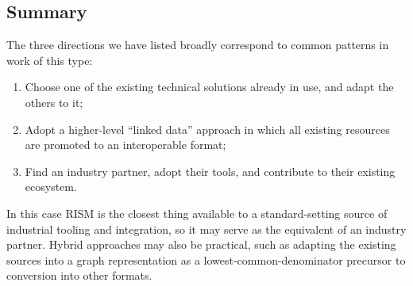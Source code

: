 \documentclass[sigconf, nonacm=true]{acmart}
\begin{document}
\begin{sloppypar}
  \subsection{Summary}

  The three directions we have listed broadly correspond to common
  patterns in work of this type:

  \begin{enumerate}
  \item Choose one of the existing technical solutions already in use,
    and adapt the others to it;
  \item Adopt a higher-level ``linked data'' approach in which all
    existing resources are promoted to an interoperable format;
  \item Find an industry partner, adopt their tools, and contribute to
    their existing ecosystem.
  \end{enumerate}

  In this case RISM is the closest thing available to a
  standard-setting source of industrial tooling and integration, so it
  may serve as the equivalent of an industry partner. Hybrid
  approaches may also be practical, such as adapting the existing
  sources into a graph representation as a lowest-common-denominator
  precursor to conversion into other formats.
  
\end{sloppypar}
  
\end{document}

